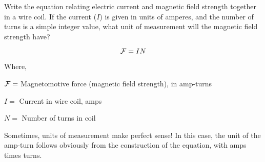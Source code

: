 

Write the equation relating electric current and magnetic field strength together in a wire coil.  If the current ($I$) is given in units of amperes, and the number of turns is a simple integer value, what unit of measurement will the magnetic field strength have?







$${\cal F} = IN$$

\noindent
Where,

${\cal F} =$ Magnetomotive force (magnetic field strength), in amp-turns

$I =$ Current in wire coil, amps

$N =$ Number of turns in coil







Sometimes, units of measurement make perfect sense!  In this case, the unit of the amp-turn follows obviously from the construction of the equation, with amps times turns.



